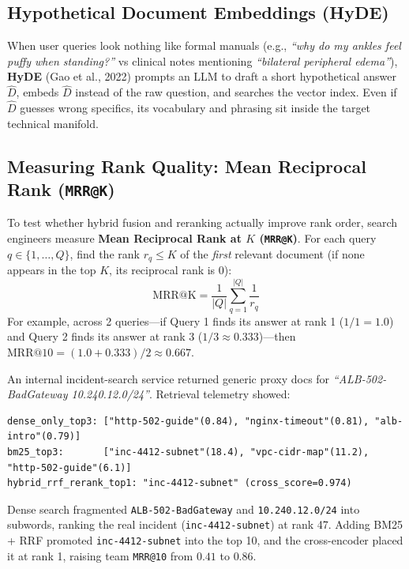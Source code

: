 \subsection{Hypothetical Document Embeddings (HyDE)}
When user queries look nothing like formal manuals (e.g., \emph{``why do my ankles feel puffy when standing?''} vs clinical notes mentioning \emph{``bilateral peripheral edema''}), \textbf{HyDE} (Gao et al., 2022) prompts an LLM to draft a short hypothetical answer $\hat{D}$, embeds $\hat{D}$ instead of the raw question, and searches the vector index. Even if $\hat{D}$ guesses wrong specifics, its vocabulary and phrasing sit inside the target technical manifold.

\subsection{Measuring Rank Quality: Mean Reciprocal Rank (\texttt{MRR@K})}
To test whether hybrid fusion and reranking actually improve rank order, search engineers measure \textbf{Mean Reciprocal Rank at $K$ (\texttt{MRR@K})}. For each query $q \in \{1, \dots, Q\}$, find the rank $r_q \le K$ of the \emph{first} relevant document (if none appears in the top $K$, its reciprocal rank is $0$):
\begin{equation}
\text{MRR@K} = \frac{1}{|Q|} \sum_{q=1}^{|Q|} \frac{1}{r_q}
\end{equation}
For example, across 2 queries—if Query 1 finds its answer at rank 1 ($1/1 = 1.0$) and Query 2 finds its answer at rank 3 ($1/3 \approx 0.333$)—then $\text{MRR@10} = (1.0 + 0.333)/2 \approx 0.667$.

\begin{realworldbox}
An internal incident-search service returned generic proxy docs for \emph{``ALB-502-BadGateway 10.240.12.0/24''}. Retrieval telemetry showed:
\begin{lstlisting}[basicstyle=\ttfamily\scriptsize]
dense_only_top3: ["http-502-guide"(0.84), "nginx-timeout"(0.81), "alb-intro"(0.79)]
bm25_top3:       ["inc-4412-subnet"(18.4), "vpc-cidr-map"(11.2), "http-502-guide"(6.1)]
hybrid_rrf_rerank_top1: "inc-4412-subnet" (cross_score=0.974)
\end{lstlisting}
Dense search fragmented \texttt{ALB-502-BadGateway} and \texttt{10.240.12.0/24} into subwords, ranking the real incident (\texttt{inc-4412-subnet}) at rank 47. Adding BM25 + RRF promoted \texttt{inc-4412-subnet} into the top 10, and the cross-encoder placed it at rank 1, raising team \texttt{MRR@10} from $0.41$ to $0.86$.
\end{realworldbox}

